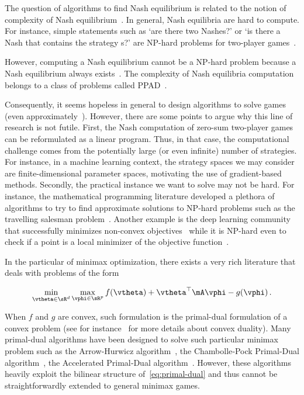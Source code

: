 The question of algorithms to find Nash equilibrium is related to the notion of complexity of Nash equilibrium~\citep{papadimitriou2007complexity}. In general, Nash equilibria are hard to compute. For instance, simple statements such as ‘are there two Nashes?’ or ‘is there a Nash that contains the strategy s?’ are NP-hard problems for two-player games~\citep{gilboa1989nash}. 

However, computing a Nash equilibrium cannot be a NP-hard problem because a Nash equilibrium always exists~\citep{papadimitriou2007complexity}. The complexity of Nash equilibria computation belongs to a class of problems called PPAD~\citep{daskalakis2009complexity}. 




Consequently, it seems hopeless in general to design algorithms to solve games (even approximately~\citep{papadimitriou2007complexity}). However, there are some points to argue why this line of research is not futile. First, the Nash computation of zero-sum two-player games can be reformulated as a linear program. Thus, in that case, the computational challenge comes from the potentially large (or even infinite) number of strategies. For instance, in a machine learning context, the strategy spaces we may consider are finite-dimensional parameter spaces, motivating the use of gradient-based methods. Secondly, the practical instance we want to solve may not be hard. For instance, the mathematical programming literature developed a plethora of algorithms to try to find approximate solutions to NP-hard problems such as the travelling salesman problem~\citep{bellmore1968traveling}. Another example is the deep learning community that successfully minimizes non-convex objectives~\citep{zhang2016understanding} while it is NP-hard even to check if a point is a local minimizer of the objective function~\citep{murty1985some,nesterov2000squared}. 




In the particular of minimax optimization, there exists a very rich literature that deals with problems of the form

\begin{equation}\label{eq:primal-dual}
\min_{\vtheta \in \sR^d} \max_{\vphi \in \sR^p} f(\vtheta) + \vtheta^\top \mA \vphi - g(\vphi) \,.
\end{equation}

When $f$ and $g$ are convex, such formulation is the primal-dual formulation of a convex problem (see for instance~\citep{rockafellar1970convex} for more details about convex duality). Many primal-dual algorithms have been designed to solve such particular minimax problem such as the Arrow‐Hurwicz algorithm~\citep{arrow1958studies,zhu2008efficient}, the Chambolle‐Pock Primal‐Dual algorithm~\citep{chambolle2011first,chambolle2016ergodic}, the Accelerated Primal‐Dual algorithm~\citep{ouyang2015accelerated}. However, these algorithms heavily exploit the bilinear structure of~\eqref{eq:primal-dual} and thus cannot be straightforwardly extended to general minimax games. 




